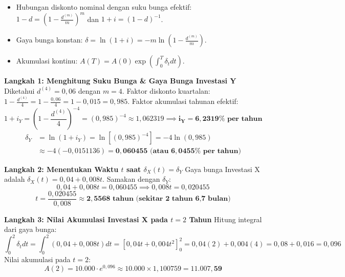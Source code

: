 \documentclass[11pt,a4paper]{article}
\begin{document}
\begin{solusibox}[2]
\begin{konsepbox}
\begin{itemize}[leftmargin=4mm, topsep=1pt, itemsep=1pt]
    \item Hubungan diskonto nominal dengan suku bunga efektif: $1 - d = \left(1 - \frac{d^{(m)}}{m}\right)^m$ dan $1 + i = (1 - d)^{-1}$.
    \item Gaya bunga konstan: $\delta = \ln(1+i) = -m \ln\left(1 - \frac{d^{(m)}}{m}\right)$.
    \item Akumulasi kontinu: $A(T) = A(0) \exp\left(\int_0^T \delta_t dt\right)$.
\end{itemize}
\end{konsepbox}

\textbf{Langkah 1: Menghitung Suku Bunga \& Gaya Bunga Investasi Y}  
Diketahui $d^{(4)} = 0{,}06$ dengan $m=4$.  
Faktor diskonto kuartalan: $1 - \frac{d^{(4)}}{4} = 1 - \frac{0{,}06}{4} = 1 - 0{,}015 = 0{,}985$.  
Faktor akumulasi tahunan efektif:
$$1 + i_Y = \left(1 - \frac{d^{(4)}}{4}\right)^{-4} = (0{,}985)^{-4} \approx 1{,}062319 \implies \mathbf{i_Y = 6{,}2319\% \text{ per tahun}}$$
\begin{align*}
    \delta_Y &= \ln(1 + i_Y) = \ln\left[(0{,}985)^{-4}\right] = -4 \ln(0{,}985) \\
    &\approx -4(-0{,}0151136) = \mathbf{0{,}060455 \text{ (atau } 6{,}0455\% \text{ per tahun)}}
\end{align*}

\textbf{Langkah 2: Menentukan Waktu $t$ saat $\delta_X(t) = \delta_Y$}  
Gaya bunga Investasi X adalah $\delta_X(t) = 0{,}04 + 0{,}008t$. Samakan dengan $\delta_Y$:
$$0{,}04 + 0{,}008t = 0{,}060455 \implies 0{,}008t = 0{,}020455$$
$$t = \frac{0{,}020455}{0{,}008} \approx \mathbf{2{,}5568 \text{ tahun (sekitar 2 tahun 6,7 bulan)}}$$

\textbf{Langkah 3: Nilai Akumulasi Investasi X pada $t=2$ Tahun}  
Hitung integral dari gaya bunga:
$$\int_0^2 \delta_t dt = \int_0^2 (0{,}04 + 0{,}008t) dt = \left[ 0{,}04t + 0{,}004t^2 \right]_0^2 = 0{,}04(2) + 0{,}004(4) = 0{,}08 + 0{,}016 = 0{,}096$$
Nilai akumulasi pada $t=2$:
$$A(2) = 10.000 \cdot e^{0{,}096} \approx 10.000 \times 1{,}100759 = \mathbf{11.007{,}59}$$
\end{solusibox}

\newpage
\end{document}

